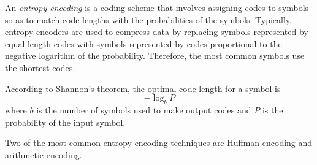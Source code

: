 \documentclass[12pt]{article}
\begin{document}
An \emph{entropy encoding} is a coding scheme that involves assigning codes to symbols so as to match code lengths with the probabilities of the symbols.  Typically, entropy encoders are used to compress data by replacing symbols represented by equal-length codes with symbols represented by codes proportional to the negative logarithm of the probability.  Therefore, the most common symbols use the shortest codes.

According to Shannon's theorem, the optimal code length for a symbol is
$$-\log_b P$$
where $b$ is the number of symbols used to make output codes and $P$ is the probability of the input symbol.

Two of the most common entropy encoding techniques are Huffman encoding and arithmetic encoding.
\end{document}

